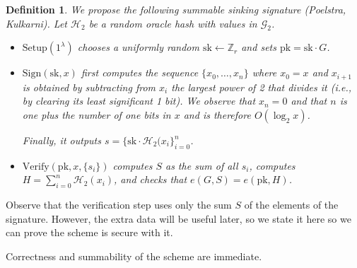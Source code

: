 \documentclass[letterpaper]{article}
\newtheorem{defn}{Definition}
\newcommand{\Setup}{\mathrm{Setup}}
\newcommand{\Sign}{\mathrm{Sign}}
\newcommand{\Verify}{\mathrm{Verify}}
\newcommand{\sk}{\mathrm{sk}}
\newcommand{\pk}{\mathrm{pk}}
\newcommand{\hash}{\mathcal{H}_2}
\begin{document}
\begin{defn}\label{defn:pkss}
We propose the following summable sinking signature (Poelstra, Kulkarni).
Let $\hash$ be a random oracle hash with values in $\mathcal{G}_2$.
\begin{itemize}
\item $\Setup(1^\lambda)$ chooses a uniformly random $\sk\gets\mathbb{Z}_r$
and sets $\pk = \sk\cdot G$.
\item $\Sign(\sk, x)$ first computes the sequence $\{x_0,\ldots,x_n\}$
where $x_0 = x$ and $x_{i+1}$ is obtained by subtracting from $x_i$ the
largest power of 2 that divides it (\emph{i.e.}, by clearing its least
significant 1 bit). We observe that $x_n = 0$ and that $n$ is one plus
the number of one bits in $x$ and is therefore $O(\log_2x)$.

Finally, it outputs $s = \{\sk\cdot \hash(x_i\}_{i=0}^n$.
\item $\Verify(\pk, x, \{s_i\})$ computes $S$ as the sum of all $s_i$,
computes $H = \sum_{i=0}^n \hash(x_i)$, and checks that $e(G, S) = e(\pk, H)$.
\end{itemize}
\end{defn}
Observe that the verification step uses only the sum $S$ of the elements
of the signature. However, the extra data will be useful later, so we state
it here so we can prove the scheme is secure with it.

Correctness and summability of the scheme are immediate.
\end{document}
